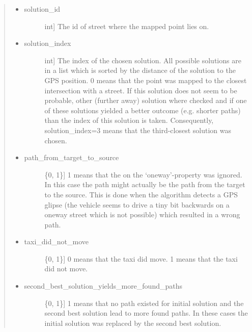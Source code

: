 \documentclass[letterpaper,10pt,english]{sphinxmanual}
\begin{document}
\begin{fulllineitems}
\begin{quote}
\begin{description}
\begin{description}
\begin{itemize}
\begin{description}
\end{description}

\item {} \begin{description}
\item[{solution\_id}] \leavevmode{[}int{]}
The id of street where the mapped point lies on.

\end{description}

\item {} \begin{description}
\item[{solution\_index}] \leavevmode{[}int{]}
The index of the chosen solution. All possible solutions are in a list which is sorted by the distance of the solution to the GPS position. 0 means that the point was mapped to the closest intersection with a street. If this solution does not seem to be probable, other (further away) solution where checked and if one of these solutions yielded a better outcome (e.g. shorter paths) than the index of this solution is taken. Consequently, solution\_index=3 means that the third-closest solution was chosen.

\end{description}

\item {} \begin{description}
\item[{path\_from\_target\_to\_source}] \leavevmode{[}\{0, 1\}{]}
1 means that the on the ‘oneway’-property was ignored. In this case the path might actually be the path from the target to the source. This is done when the algorithm detects a GPS glipse (the vehicle seems to drive a tiny bit backwards on a oneway street which is not possible) which resulted in a wrong path.

\end{description}

\item {} \begin{description}
\item[{taxi\_did\_not\_move}] \leavevmode{[}\{0, 1\}{]}
0 means that the taxi did move. 1 means that the taxi did not move.

\end{description}

\item {} \begin{description}
\item[{second\_best\_solution\_yields\_more\_found\_paths}] \leavevmode{[}\{0, 1\}{]}
1 means that no path existed for initial solution and the second best solution lead to more found paths. In these cases the initial solution was replaced by the second best solution.


\end{description}
\end{itemize}
\end{description}
\end{description}
\end{quote}
\end{fulllineitems}
\end{document}
